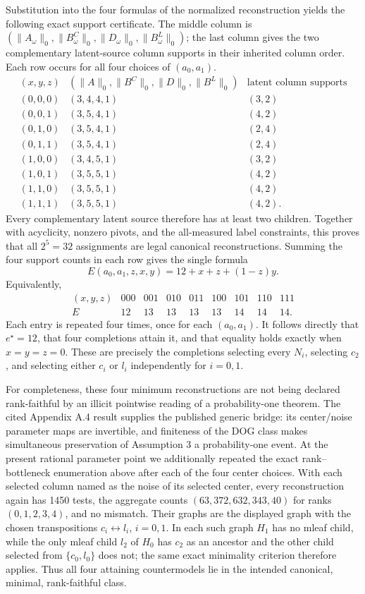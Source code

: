 Substitution into the four formulas of the normalized reconstruction yields the following exact support certificate.  The middle column is \((\|A_\omega\|_0,\|B^C_\omega\|_0,\|D_\omega\|_0,\|B^L_\omega\|_0)\); the last column gives the two complementary latent-source column supports in their inherited column order.  Each row occurs for all four choices of \((a_0,a_1)\).
\[
\begin{array}{c|c|c}
(x,y,z)&(\|A\|_0,\|B^C\|_0,\|D\|_0,\|B^L\|_0)&\text{latent column supports}\\ \hline
(0,0,0)&(3,4,4,1)&(3,2)\\
(0,0,1)&(3,5,4,1)&(4,2)\\
(0,1,0)&(3,5,4,1)&(2,4)\\
(0,1,1)&(3,5,4,1)&(2,4)\\
(1,0,0)&(3,4,5,1)&(3,2)\\
(1,0,1)&(3,5,5,1)&(4,2)\\
(1,1,0)&(3,5,5,1)&(4,2)\\
(1,1,1)&(3,5,5,1)&(4,2).
\end{array}
\]
Every complementary latent source therefore has at least two children.  Together with acyclicity, nonzero pivots, and the all-measured label constraints, this proves that all \(2^5=32\) assignments are legal canonical reconstructions.  Summing the four support counts in each row gives the single formula
\[
E(a_0,a_1,z,x,y)=12+x+z+(1-z)y.
\]
Equivalently,
\[
\begin{array}{c|cccccccc}
(x,y,z)&000&001&010&011&100&101&110&111\\ \hline
E&12&13&13&13&13&14&14&14.
\end{array}
\]
Each entry is repeated four times, once for each \((a_0,a_1)\).  It follows directly that \(e^\star=12\), that four completions attain it, and that equality holds exactly when \(x=y=z=0\).  These are precisely the completions selecting every \(N_i\), selecting \(c_2\), and selecting either \(c_i\) or \(l_i\) independently for \(i=0,1\).

For completeness, these four minimum reconstructions are not being declared rank-faithful by an illicit pointwise reading of a probability-one theorem.  The cited Appendix A.4 result supplies the published generic bridge: its center/noise parameter maps are invertible, and finiteness of the DOG class makes simultaneous preservation of Assumption 3 a probability-one event.  At the present rational parameter point we additionally repeated the exact rank--bottleneck enumeration above after each of the four center choices.  With each selected column named as the noise of its selected center, every reconstruction again has 1450 tests, the aggregate counts \((63,372,632,343,40)\) for ranks \((0,1,2,3,4)\), and no mismatch.  Their graphs are the displayed graph with the chosen transpositions \(c_i\leftrightarrow l_i\), \(i=0,1\).  In each such graph \(H_1\) has no mleaf child, while the only mleaf child \(l_2\) of \(H_0\) has \(c_2\) as an ancestor and the other child selected from \(\{c_0,l_0\}\) does not; the same exact minimality criterion therefore applies.  Thus all four attaining countermodels lie in the intended canonical, minimal, rank-faithful class.

